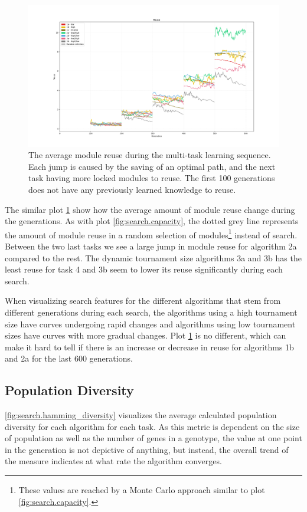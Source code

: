 \begin{figure}[p!]%
    \includegraphics[width=\textwidth]{Chapters/Experiments/search_algo/figures/Module_reuse_pr_generation.png}
    \caption{The average module reuse during the multi-task learning sequence. Each jump is caused by the saving of an optimal path, and the next task having more locked modules to reuse. The first 100 generations does not have any previously learned knowledge to reuse.}
    \label{fig:search.reuse}
\end{figure}

The similar plot \ref{fig:search.reuse} show how the average amount of module reuse change during the generations. As with plot \ref{fig:search.capacity}, the dotted grey line represents the amount of module reuse in a random selection of modules\footnote{These values are reached by a Monte Carlo approach similar to plot \ref{fig:search.capacity}.} instead of search. Between the two last tasks we see a large jump in module reuse for algorithm 2a compared to the rest. The dynamic tournament size algorithms 3a and 3b has the least reuse for task 4 and 3b seem to lower its reuse significantly during each search. 

When visualizing search features for the different algorithms that stem from different generations during each search, the algorithms using a high tournament size have curves undergoing rapid changes and algorithms using low tournament sizes have curves with more gradual changes. Plot \ref{fig:search.reuse} is no different, which can make it hard to tell if there is an increase or decrease in reuse for algorithms 1b and 2a for the last 600 generations. 

\subsection{Population Diversity}
\ref{fig:search.hamming_diversity} visualizes the average calculated population diversity for each algorithm for each task. As this metric is dependent on the size of population as well as the number of genes in a genotype, the value at one point in the generation is not depictive of anything, but instead, the overall trend of the measure indicates at what rate the algorithm converges. 

